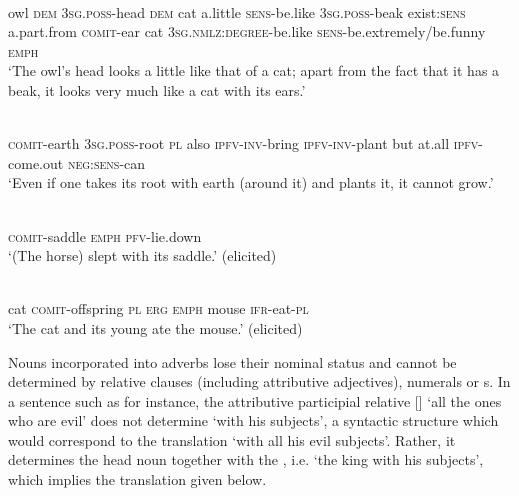 \documentclass[output=paper]{langsci/langscibook}
\begin{document}
\begin{exe}
\ex \label{ex:kArnWrna}
\gll
{}  	  	  	  	  	  	  	  	  	    	  	  	  	  \\
owl \textsc{dem} \textsc{3sg.poss}-head \textsc{dem} cat a.little \textsc{sens}-be.like \textsc{3sg.poss}-beak exist:\textsc{sens} a.part.from \textsc{comit}-ear cat \textsc{3sg.nmlz:degree}-be.like \textsc{sens}-be.extremely/be.funny \textsc{emph} \\
\glt `The owl's head looks a little like that of a cat; apart from the fact that it has a beak, it looks very much like a cat with its ears.'
\end{exe}


\begin{exe}
\ex \label{ex:kAthAlwWlwa}
\gll {}  	  	  	  	  	  	  	  	  	  \\
\textsc{comit}-earth \textsc{3sg.poss}-root \textsc{pl} also \textsc{ipfv-inv}-bring \textsc{ipfv-inv}-plant but at.all \textsc{ipfv}-come.out \textsc{neg:sens}-can \\
\glt `Even if one takes its root with earth (around it) and plants it, it cannot grow.'
\end{exe}


\begin{exe}
\ex \label{ex:kAsnWsno}
\gll {}  	  	  \\
\textsc{comit}-saddle \textsc{emph} \textsc{pfv}-lie.down \\
\glt `(The horse) slept with its saddle.' (elicited)
\end{exe}

\begin{exe}
\ex \label{ex:kArJWrJit.kW}
\gll 
{} 	 	 	 	 	 	 \\
cat \textsc{comit}-offspring \textsc{pl}  \textsc{erg} \textsc{emph} mouse \textsc{ifr}-eat-\textsc{pl} \\
\glt `The cat and its young ate the mouse.' (elicited)
\end{exe}

Nouns incorporated into  adverbs lose their nominal status and cannot be determined by relative clauses (including attributive adjectives), numerals or s. In a sentence such as  for instance, the attributive participial relative [] `all the ones who are evil' does not determine  `with his subjects', a syntactic structure which would correspond to the translation `with all his evil subjects'. Rather, it determines the head noun together with the , i.e.    `the king with his subjects', which implies the translation given below.
\end{document}
